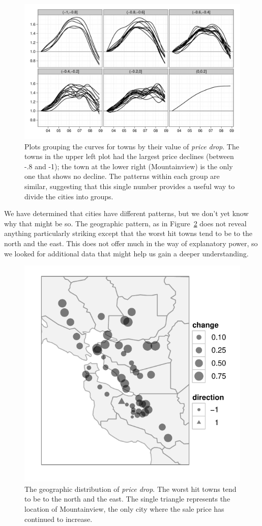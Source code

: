 \documentclass[oneside]{article}
\begin{document}
\begin{figure}[htbp]
  \centering
    \includegraphics[width=0.75\linewidth]{cities-indexed-grouped}
  \caption{Plots grouping the curves for towns by their value of {\em price drop}.  The towns in the upper left plot had the largest price declines (between -.8 and -1); the town at the lower right (Mountainview) is the only one that shows no decline.  The patterns within each group are similar, suggesting that this single number provides a useful way to divide the cities into groups.}
  \label{fig:groups}
\end{figure}

We have determined that cities have different patterns, but we don't yet know why that might be so.  The geographic pattern, as in Figure~\ref{fig:geo} does not reveal anything particularly striking except that the worst hit towns tend to be to the north and the east. This does not offer much in the way of explanatory power, so we looked for additional data that might help us gain a deeper understanding. 

\begin{figure}[htbp]
  \centering
    \includegraphics[width=0.5\linewidth]{cities-geo-changes}
  \caption{The geographic distribution of {\em price drop}.  The worst hit towns tend to be to the north and the east. The single triangle represents the location of Mountainview, the only city where the sale price has continued to increase. }
  \label{fig:geo}
\end{figure}
\end{document}
